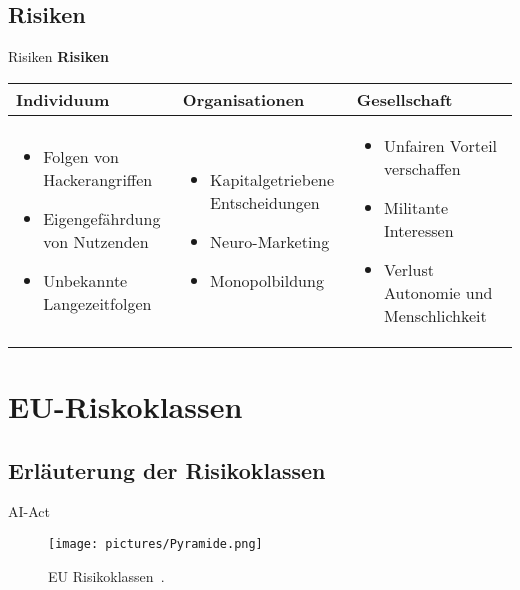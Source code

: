 \documentclass[aspectratio=169,16pt,xcolor=table]{beamer}
\begin{document}
\subsection{Risiken}
\begin{frame}{Risiken}
    \textbf{Risiken}
    \begin{table}
    \centering
         \setlength{\leftmargini}{0.4cm}
       \begin{tabular}{| m{4cm} | m{4cm} | m{4cm}|}
        \hline
        \footnotesize{Individuum} & \footnotesize{Organisationen} & \footnotesize{Gesellschaft} \\ 
        \hline
        \begin{itemize}
        \item \scriptsize{Folgen von Hackerangriffen~\cite{khan_aziz_2019}} 
        \item \scriptsize{ Eigengefährdung von Nutzenden~\cite{khan_aziz_2019}}
        \item \scriptsize{ Unbekannte Langezeitfolgen~\cite{Burwell:2017aa}}
        \end{itemize}
        & 
        \begin{itemize}
        \item \scriptsize{Kapitalgetriebene Entscheidungen~\cite{khan_aziz_2019}} 
        \item \scriptsize{ Neuro-Marketing~\cite{khan_aziz_2019}}
        \item \scriptsize{ Monopolbildung~\cite{khan_aziz_2019}}
        \end{itemize}
        &
        \begin{itemize}
        \item \scriptsize{Unfairen Vorteil verschaffen~\cite{khan_aziz_2019} }
        \item \scriptsize{ Militante Interessen~\cite{khan_aziz_2019}}
        \item \scriptsize{ Verlust Autonomie und Menschlichkeit~\cite{Burwell:2017aa}}
        \end{itemize}
        \\
        \hline
    \end{tabular}
    \end{table}
\end{frame}

\section{EU-Riskoklassen}
\subsection{Erläuterung der Risikoklassen}
\begin{frame}{AI-Act}
  \begin{figure}[h!]
    \centering   
	\texttt{[image: pictures/Pyramide.png]}
  	\centering
	\caption{
    		EU Risikoklassen~\cite{AI_Act}.
  	}
    \end{figure}
\end{frame}
\end{document}
